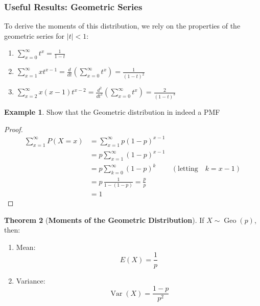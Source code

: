 \documentclass[12pt,a4paper]{report}
\theoremstyle{definition}
\newtheorem{thm}{Theorem}[section]
\newtheorem{example}[thm]{Example}
\theoremstyle{plain}
\theoremstyle{definition}
\begin{document}
\subsubsection{Useful Results: Geometric Series}
To derive the moments of this distribution, we rely on the properties of the geometric series for $|t| < 1$:
\begin{enumerate}
\item $\sum_{x = 0}^{\infty} t^x = \frac{1}{1-t}$
\item $\sum_{x = 1}^{\infty} x t^{x-1} = \frac{d}{dt} \left( \sum_{x = 0}^{\infty} t^x \right) = \frac{1}{(1-t)^2}$
\item $\sum_{x = 2}^{\infty} x(x-1) t^{x-2} = \frac{d^2}{dt^2} \left( \sum_{x = 0}^{\infty} t^x \right) = \frac{2}{(1-t)^3}$
\end{enumerate}




\begin{example}
Show that the Geometric distribution in indeed a PMF
\end{example}
\begin{proof}
\begin{align*}
\sum^{\infty}_{x=1}P(X=x) &=\sum^{\infty}_{x=1}p(1-p)^{x-1}\\
                          &=p\sum^{\infty}_{x=1}(1-p)^{x-1}\\
                          &=p\sum^{\infty}_{k=0}(1-p)^k\,\quad\quad (\text{letting}\quad k = x - 1)\\
                          &=p\, \frac{1}{1-(1-p)}=\frac{p}{p}\\
                          &=1
\end{align*}
\end{proof}




\begin{thm}[\textbf{Moments of the Geometric Distribution}]
If $X \sim \operatorname{Geo}(p)$, then:
\begin{enumerate}
\item Mean: \[E(X) = \frac{1}{p}\]
\item Variance: \[\operatorname{Var}(X) = \frac{1-p}{p^2}\]
\end{enumerate}
\end{thm}
\end{document}
